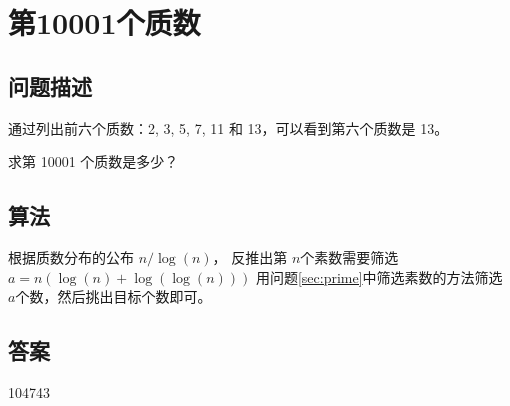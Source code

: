 \section{第10001个质数}
\subsection{问题描述}
\begin{tcolorbox}
通过列出前六个质数：2, 3, 5, 7, 11 和 13，可以看到第六个质数是 13。

求第 10001 个质数是多少？
\end{tcolorbox}

\subsection{算法}
根据质数分布的公布 \( n / \log(n) \)，
反推出第 \( n \)个素数需要筛选 \( a = n (\log(n) + \log(\log(n))) \)
用问题\ref{sec:prime}中筛选素数的方法筛选 \( a  \)个数，然后挑出目标个数即可。

\subsection{答案}
104743
